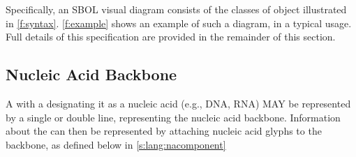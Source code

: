 Specifically, an SBOL visual diagram consists of the classes of object illustrated in \ref{f:syntax}.
\ref{f:example} shows an example of such a diagram, in a typical usage.
Full details of this specification are provided in the remainder of this section.


\subsection{Nucleic Acid Backbone}
\label{s:lang:backbone}

A  with a  designating it as a nucleic acid (e.g., DNA, RNA) MAY be represented by a single or double line, representing the nucleic acid backbone. 
Information about the  can then be represented by attaching nucleic acid glyphs to the backbone, as defined below in \ref{s:lang:nacomponent}

